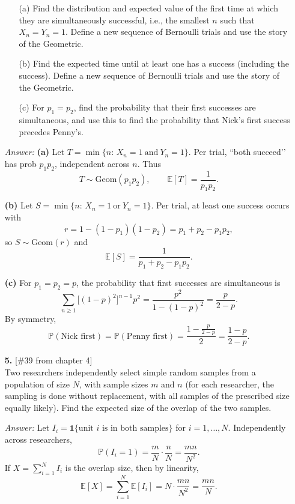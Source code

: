 \documentclass{article}
\begin{document}
\begin{enumerate}
\begin{enumerate}
    \item[(a)] Find the distribution and expected value of the first time at which they are simultaneously successful, i.e., the smallest $n$ such that $X_n = Y_n = 1$. 
    Define a new sequence of Bernoulli trials and use the story of the Geometric.

    \item[(b)] Find the expected time until at least one has a success (including the success). 
    Define a new sequence of Bernoulli trials and use the story of the Geometric.

    \item[(c)] For $p_1 = p_2$, find the probability that their first successes are simultaneous, and use this to find the probability that Nick’s first success precedes Penny’s.
\end{enumerate}

\medskip
\noindent\textit{Answer:}
\textbf{(a)} Let $T=\min\{n:\,X_n=1\ \text{and}\ Y_n=1\}$. Per trial, “both succeed’’ has prob $p_1p_2$, independent across $n$. Thus
\[
T\sim \text{Geom}(p_1p_2),
\qquad
\mathbb{E}[T]=\boxed{\frac{1}{p_1p_2}}.
\]

\textbf{(b)} Let $S=\min\{n:\,X_n=1\ \text{or}\ Y_n=1\}$. Per trial, at least one success occurs with
\[
r=1-(1-p_1)(1-p_2)=p_1+p_2-p_1p_2,
\]
so $S\sim \text{Geom}(r)$ and
\[
\mathbb{E}[S]=\boxed{\frac{1}{p_1+p_2-p_1p_2}}.
\]

\textbf{(c)} For $p_1=p_2=p$, the probability that first successes are simultaneous is
\[
\sum_{n\ge 1}\big[(1-p)^2\big]^{n-1}p^2
=\frac{p^2}{1-(1-p)^2}
=\boxed{\frac{p}{2-p}}.
\]
By symmetry,
\[
\mathbb{P}(\text{Nick first})=\mathbb{P}(\text{Penny first})
=\frac{1-\frac{p}{2-p}}{2}
=\boxed{\frac{1-p}{2-p}}.
\]

\bigskip

\item[\textbf{5.}] [\#39 from chapter 4]\\
Two researchers independently select simple random samples from a population of size $N$, with sample sizes $m$ and $n$ (for each researcher, the sampling is done without replacement, with all samples of the prescribed size equally likely).
Find the expected size of the overlap of the two samples.

\medskip
\noindent\textit{Answer:}
Let $I_i=\mathbf{1}\{\text{unit $i$ is in both samples}\}$ for $i=1,\dots,N$.
Independently across researchers,
\[
\mathbb{P}(I_i=1)=\frac{m}{N}\cdot\frac{n}{N}=\frac{mn}{N^2}.
\]
If $X=\sum_{i=1}^N I_i$ is the overlap size, then by linearity,
\[
\mathbb{E}[X]=\sum_{i=1}^N \mathbb{E}[I_i]
=N\cdot \frac{mn}{N^2}
=\boxed{\frac{mn}{N}}.
\]


\end{enumerate}
\end{document}
